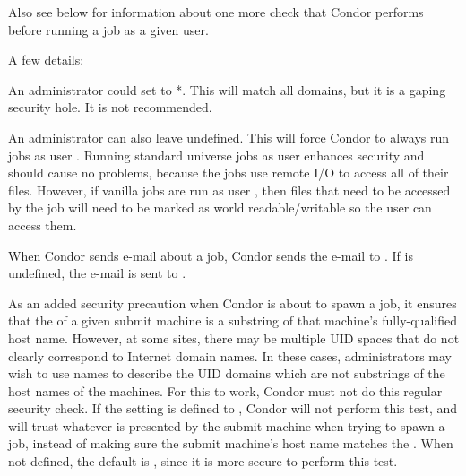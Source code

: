 \begin{description}
  Also see 
  below for information about one more check
  that Condor performs before running a job as a given user.

  A few details:

  An administrator could set 
  to *. This will match all domains,
  but it is a gaping security hole. It is not recommended.

  An administrator can also leave  undefined.
  This will force Condor to always run jobs as user .
  Running standard universe jobs as user  enhances
  security and should cause no problems, because the jobs use remote
  I/O to access all of their files.
  However, if vanilla jobs are run as
  user , then files that need to be accessed by the job will need
  to be marked as world readable/writable so the user  can access
  them.

  When Condor sends e-mail about a job, Condor sends the e-mail to
  .
  If 
  is undefined, the e-mail is sent to .


\label{param:TrustUidDomain}
\item[\Macro{TRUST\_UID\_DOMAIN}]
  As an added security precaution when Condor is about to spawn a job,
  it ensures that the  of a given
  submit machine is a substring of that machine's fully-qualified
  host name.
  However, at some sites, there may be multiple UID spaces that do
  not clearly correspond to Internet domain names.
  In these cases, administrators may wish to use names to describe the
  UID domains which are not substrings of the host names of the
  machines.
  For this to work, Condor must not do this regular security check.
  If the  setting is defined to ,
  Condor will not perform this test, and will trust whatever
   is presented by the submit machine when trying
  to spawn a job, instead of making sure the submit machine's host name
  matches the .
  When not defined, the default is ,
  since it is more secure to perform this test. 


\end{description}
